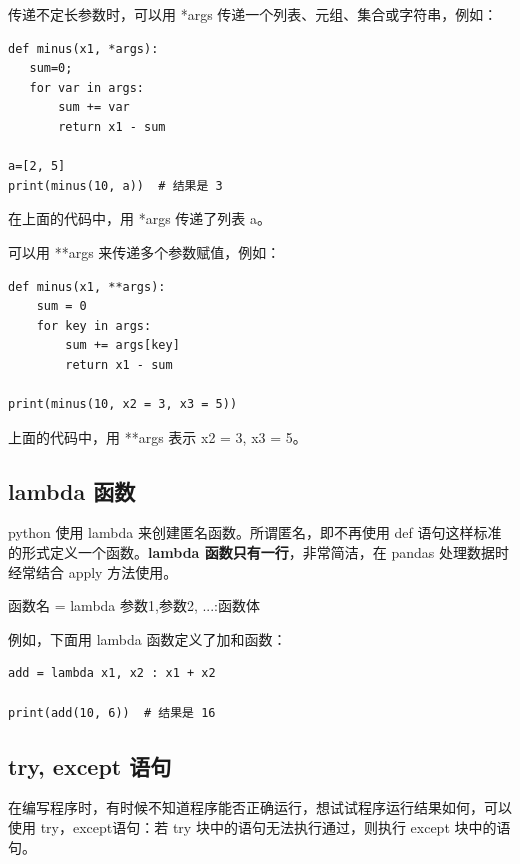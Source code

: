 传递不定长参数时，可以用 *args 传递一个列表、元组、集合或字符串，例如：
\begin{lstlisting}[Language=Python]
def minus(x1, *args):
   sum=0;
   for var in args:
       sum += var
       return x1 - sum

a=[2, 5]
print(minus(10, a))  # 结果是 3
\end{lstlisting}

在上面的代码中，用 *args 传递了列表 a。

可以用 **args 来传递多个参数赋值，例如：
\begin{lstlisting}[Language=Python]
def minus(x1, **args):
    sum = 0
    for key in args:
        sum += args[key]
        return x1 - sum

print(minus(10, x2 = 3, x3 = 5))
\end{lstlisting}

上面的代码中，用 **args 表示 x2 = 3, x3 = 5。


\subsection{lambda 函数}

python 使用 lambda 来创建匿名函数。所谓匿名，即不再使用 def 语句这样标准的形式定义一个函数。\textbf{lambda 函数只有一行}，非常简洁，在 pandas 处理数据时经常结合 apply 方法使用。

\begin{center}
\begin{tcolorbox} [title = lambda 函数的一般格式]
  \bf
  \begin{tcboutputlisting}
    函数名 = lambda 参数1,参数2, ...:\quad 函数体
\end{tcboutputlisting}
\end{tcolorbox}
\end{center}

例如，下面用 lambda 函数定义了加和函数：
\begin{lstlisting}[Language=Python]
add = lambda x1, x2 : x1 + x2

print(add(10, 6))  # 结果是 16
\end{lstlisting}


\subsection{try, except 语句}

在编写程序时，有时候不知道程序能否正确运行，想试试程序运行结果如何，可以使用 try，except语句：若 try 块中的语句无法执行通过，则执行 except 块中的语句。

